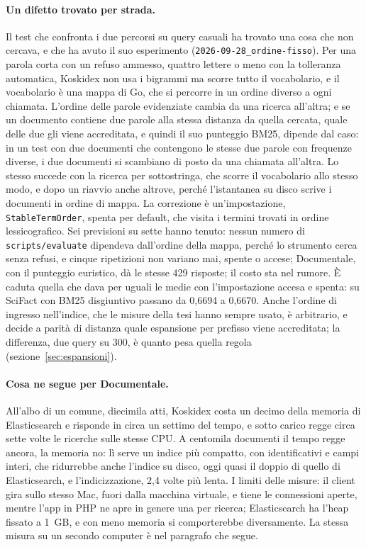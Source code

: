 \paragraph{Un difetto trovato per strada.} Il test che confronta i due percorsi
su query casuali ha trovato una cosa che non cercava, e che ha avuto il suo
esperimento (\texttt{2026-09-28\_ordine-fisso}). Per una parola corta con
un refuso ammesso, quattro lettere o meno con la tolleranza automatica,
Koskidex non usa i bigrammi ma scorre tutto il vocabolario, e il vocabolario è
una mappa di Go, che si percorre in un ordine diverso a ogni chiamata. L'ordine
delle parole evidenziate cambia da una ricerca all'altra; e se un documento
contiene due parole alla stessa distanza da quella cercata, quale delle due gli
viene accreditata, e quindi il suo punteggio BM25, dipende dal caso: in un test
con due documenti che contengono le stesse due parole con frequenze diverse,
i due documenti si scambiano di posto da una chiamata all'altra. Lo stesso
succede con la ricerca per sottostringa, che scorre il vocabolario allo stesso
modo, e dopo un riavvio anche altrove, perché l'istantanea su disco scrive i
documenti in ordine di mappa. La correzione è un'impostazione,
\texttt{StableTermOrder}, spenta per default, che visita i termini trovati in
ordine lessicografico. Sei previsioni su sette hanno tenuto: nessun numero di
\texttt{scripts/evaluate} dipendeva dall'ordine della mappa, perché lo
strumento cerca senza refusi, e cinque ripetizioni non variano mai, spente o
accese; Documentale, con il punteggio euristico, dà le stesse 429 risposte;
il costo sta nel rumore. È caduta quella che dava per uguali le medie con
l'impostazione accesa e spenta: su SciFact con BM25 disgiuntivo passano da
0,6694 a 0,6670. Anche l'ordine di ingresso nell'indice, che le misure della
tesi hanno sempre usato, è arbitrario, e decide a parità di distanza quale
espansione per prefisso viene accreditata; la differenza, due query su 300, è
quanto pesa quella regola (sezione~\ref{sec:espansioni}).

\paragraph{Cosa ne segue per Documentale.} All'albo di un comune, diecimila
atti, Koskidex costa un decimo della memoria di Elasticsearch e risponde in
circa un settimo del tempo, e sotto carico regge circa sette volte le ricerche
sulle stesse CPU. A centomila documenti il tempo regge ancora, la memoria no: lì
serve un indice più compatto, con identificativi e campi interi, che
ridurrebbe anche l'indice su disco, oggi quasi il doppio di quello di
Elasticsearch, e l'indicizzazione, 2,4 volte più lenta. I limiti delle
misure: il client gira sullo stesso Mac, fuori dalla macchina virtuale, e tiene
le connessioni aperte, mentre l'app in PHP ne apre in genere una per ricerca;
Elasticsearch ha l'heap fissato a 1~GB, e con meno memoria si comporterebbe
diversamente. La stessa misura su un secondo computer è nel paragrafo che
segue.

